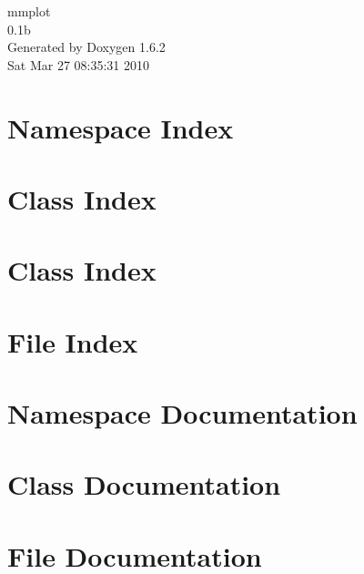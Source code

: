 \documentclass[a4paper]{book}
\begin{document}
\hypersetup{pageanchor=false}
\begin{titlepage}
\vspace*{7cm}
\begin{center}
{\Large mmplot \\[1ex]\large 0.1b }\\
\vspace*{1cm}
{\large Generated by Doxygen 1.6.2}\\
\vspace*{0.5cm}
{\small Sat Mar 27 08:35:31 2010}\\
\end{center}
\end{titlepage}
\clearemptydoublepage
{}
\tableofcontents
\clearemptydoublepage
{}
\hypersetup{pageanchor=true}
\chapter{Namespace Index}

\chapter{Class Index}

\chapter{Class Index}

\chapter{File Index}

\chapter{Namespace Documentation}


\chapter{Class Documentation}







\chapter{File Documentation}









\printindex
\end{document}
